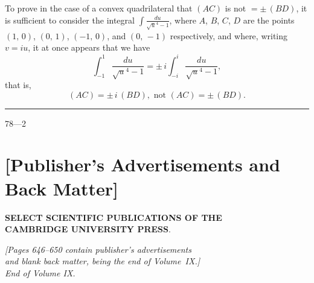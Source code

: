 \documentclass[11pt,a4paper]{book}
\begin{document}
To prove in the case of a convex quadrilateral that $(AC)$ is not $= \pm\,(BD)$, it is sufficient to consider the integral $\displaystyle\int\!\frac{du}{\surd u^4-1}$, where $A$, $B$, $C$, $D$ are the points $(1,\,0)$, $(0,\,1)$, $(-1,\,0)$, and $(0,\,-1)$ respectively, and where, writing $v = iu$, it at once appears that we have
\[
\int_{-1}^{1}\frac{du}{\surd u^4-1} = \pm\,i\int_{-i}^{i}\frac{du}{\surd u^4-1},
\]
that is,
\[
(AC) = \pm\,i\,(BD), \text{ not } (AC) = \pm\,(BD).
\]

\vspace{1ex}
\noindent\rule{2em}{0.4pt}\hfill 78---2
\newpage

\section*{[Publisher's Advertisements and Back Matter]}

\begin{center}
\textbf{SELECT SCIENTIFIC PUBLICATIONS OF THE}\\[4pt]
\textbf{CAMBRIDGE UNIVERSITY PRESS}.
\end{center}

\medskip
\begin{center}
\textit{[Pages 646--650 contain publisher's advertisements}\\
\textit{and blank back matter, being the end of Volume~IX.]}\\[8pt]
\textit{End of Volume IX.}
\end{center}
\clearpage
\end{document}
